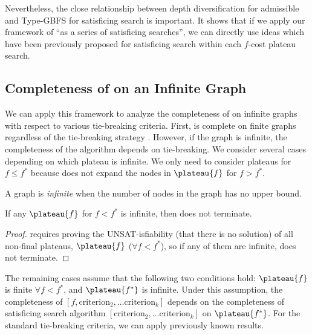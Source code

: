 Nevertheless, the close relationship between depth diversification for admissible \astar and Type-GBFS for satisficing search is important. It shows that if we apply our framework of ``\astar as a series of satisficing searches'', we can directly use ideas which have been previously proposed for satisficing search within each $f$-cost plateau search.

\subsection{Completeness of \astar on an Infinite Graph}
\label{sec:completeness-on-infinite-space}

We can apply this framework to analyze the completeness of \astar on infinite graphs with respect to various tie-breaking criteria.
First, \astar is complete on finite graphs regardless of the tie-breaking strategy \cite{hart1968formal}.
However, if the graph is infinite, the completeness of the algorithm depends on tie-breaking.
We consider several cases depending on which plateau is infinite.
 We only need to consider plateaus for $f \leq f^*$ because  \astar does not expand the nodes in $\plateau{f}$ for $f>f^*$.

\begin{defi}
 A graph is \emph{infinite} when the number of nodes in the graph has no upper bound.
\end{defi}

\begin{propo}
 \label{propo:f-less}
 If any $\plateau{f}$ for $f<f^*$ is infinite, then \astar does not terminate.
\end{propo}

\begin{proof}
  requires proving the UNSAT-isfiability (that there is no solution) of all non-final plateaus, $\plateau{f}$ ($\forall f<f^*$), so if any of them are infinite, \astar does not terminate.
\end{proof}

The remaining cases assume that the following two conditions hold: 
 $\plateau{f}$ is finite  $\forall f<f^*$, and $\plateau{f^*}$ is infinite.
Under this assumption,
the completeness of \astar $[f, \text{criterion}_2, \ldots \text{criterion}_k]$
depends on the completeness of satisficing search algorithm
$[\text{criterion}_2, \ldots \text{criterion}_k]$ on $\plateau{f^*}$.
For the standard tie-breaking criteria, we can apply previously known results.

